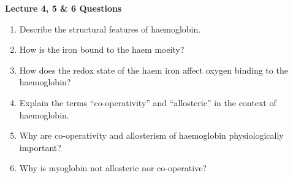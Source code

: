 \newpage
\begin{center}
\textbf{Lecture 4, 5 \& 6 Questions}
\end{center}

\begin{enumerate}

\item Describe the structural features of haemoglobin.


\item How is the iron bound to the haem moeity?


\item How does the redox state of the haem iron affect oxygen binding to the haemoglobin?


\item Explain the terms ``co-operativity'' and ``allosteric'' in the context of haemoglobin.


\item Why are co-operativity and allosterism of haemoglobin physiologically important?


\item Why is myoglobin not allosteric nor co-operative?


\end{enumerate}
